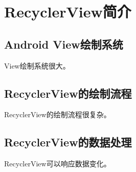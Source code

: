 \chapter{RecyclerView简介}
\section{Android View绘制系统}
View绘制系统\cite{test}很大。
\section{RecyclerView的绘制流程}
RecyclerView的绘制流程很复杂。
\section{RecyclerView的数据处理}
RecyclerView可以响应数据变化。
